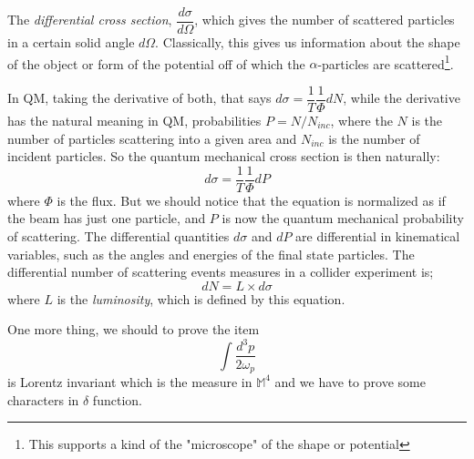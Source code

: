 \documentclass[12pt,openany]{book}
\begin{document}
	The \textit{differential cross section}, $\dfrac{d\sigma}{d\Omega}$, which gives the number of scattered particles in a certain solid angle 
	$d\Omega$. Classically, this gives us information about the shape of the object or form of the potential off of which the $\alpha$-particles are 
	scattered\footnote{This supports a kind of the "microscope" of the shape or potential}.\par 
	In QM, taking the derivative of both, that says $d\sigma=\dfrac{1}{T}\dfrac{1}{\Phi}dN$, while the derivative has the 
	natural meaning in QM, probabilities $P=N/N_{inc}$, where the $N$ is the number of particles scattering into a given area and $N_{inc}$ is the number of incident particles. 
	So the quantum mechanical cross section is then naturally:
	\begin{equation}
		d\sigma=\frac{1}{T}\frac{1}{\Phi}dP
	\end{equation}
	where $\Phi$ is the flux. But we should notice that the equation is normalized as if the beam has just one particle, and $P$ is now the quantum mechanical probability of scattering.
	The differential quantities $d\sigma$ and $dP$ are differential in kinematical variables, such as the angles and energies of the final
	state particles. The differential number of scattering events measures in a collider experiment is;
	\begin{equation}
		dN=L\times d\sigma
	\end{equation}
	where $L$ is the \textit{luminosity}, which is defined by this equation.\par 
	One more thing, we should to prove the item \begin{equation}
		\int\frac{d^3p}{2\omega_p}
	\end{equation} is Lorentz invariant which is the measure in $\mathbb{M}^4$ and we have to prove some 
	characters in $\delta$ function.
	
	
	
	
\end{document}
